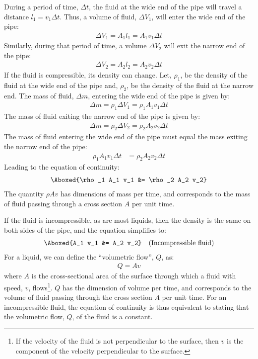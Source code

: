 {{During a period of time, $\Delta t$, the fluid at the wide end of the pipe will travel a distance $l_1=v_1\Delta t$. Thus, a volume of fluid, $\Delta V_1$, will enter the wide end of the pipe:
\begin{align*}
\Delta V_1 = A_1 l_1 = A_1 v_1 \Delta t
\end{align*}
Similarly, during that period of time, a volume $\Delta V_2$ will exit the narrow end of the pipe:
\begin{align*}
\Delta V_2 = A_2 l_2 = A_2 v_2 \Delta t
\end{align*}
If the fluid is compressible, its density can change. Let, $\rho_1$, be the density of the fluid at the wide end of the pipe and, $\rho_2$, be the density of the fluid at the narrow end. The mass of fluid, $\Delta m$, entering the wide end of the pipe is given by:
\begin{align*}
\Delta m = \rho_1 \Delta V_1= \rho_1 A_1 v_1 \Delta t
\end{align*}
The mass of fluid exiting the narrow end of the pipe is given by:
\begin{align*}
\Delta m = \rho_2 \Delta V_2= \rho_2 A_2 v_2 \Delta t
\end{align*}
The mass of fluid entering the wide end of the pipe must equal the mass exiting the narrow end of the pipe:
\begin{align*}
\rho_1 A_1 v_1 \Delta t &= \rho_2 A_2 v_2 \Delta t
\end{align*}
Leading to the equation of continuity:
\begin{align}
\Aboxed{\rho_1 A_1 v_1 &= \rho_2 A_2 v_2}
\end{align}
The quantity $\rho A v$ has dimensions of mass per time, and corresponds to the mass of fluid passing through a cross section $A$ per unit time.

If the fluid is incompressible, as are most liquids, then the density is the same on both sides of the pipe, and the equation simplifies to:
\begin{align}
\Aboxed{A_1 v_1 &= A_2 v_2}\quad\text{(Incompressible fluid)}
\end{align}
For a liquid, we can define the ``volumetric flow'', $Q$, as:
\begin{align*}
Q=Av
\end{align*}
where $A$ is the cross-sectional area of the surface through which a fluid with speed, $v$, flows\footnote{If the velocity of the fluid is not perpendicular to the surface, then $v$ is the component of the velocity perpendicular to the surface.}. $Q$ has the dimension of volume per time, and corresponds to the volume of fluid passing through the cross section $A$ per unit time. For an incompressible fluid, the equation of continuity is thus equivalent to stating that the volumetric flow, $Q$, of the fluid is a constant. 

}}
